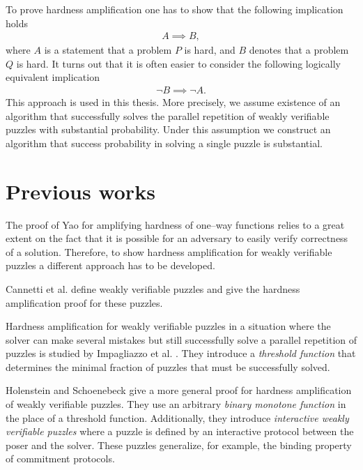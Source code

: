 To prove hardness amplification one has to show that the following implication holds
\begin{align*}
  A \implies B,
\end{align*}
where $A$ is a statement that a problem $P$ is hard, and $B$ denotes that a problem $Q$ is hard.
It turns out that it is often easier to consider the following logically equivalent implication
\begin{align*}
  \lnot B \implies \lnot A.
\end{align*}
This approach is used in this thesis. More precisely, we assume existence of an algorithm that successfully
solves the parallel repetition of weakly verifiable puzzles with substantial probability.
Under this assumption we construct an algorithm that success probability in solving a single puzzle is substantial.

\section{Previous works}
The proof of Yao for amplifying hardness of one--way functions relies to a great extent on the fact that it is possible
for an adversary to easily verify correctness of a solution. Therefore, to show hardness amplification
for weakly verifiable puzzles a different approach has to be developed.

Cannetti et al. \cite{canetti2005hardness} define weakly verifiable puzzles and give the hardness amplification proof for these puzzles.

Hardness amplification for weakly verifiable puzzles in a situation where the solver can make several mistakes but still
successfully solve a parallel repetition of puzzles is studied by Impagliazzo et al. \cite{impagliazzo2007chernoff}.
They introduce a \textit{threshold function} that determines the minimal fraction of puzzles that must be successfully solved.

Holenstein and Schoenebeck \cite{holenstein2011general} give a more general proof for hardness amplification
of weakly verifiable puzzles. They use an arbitrary \textit{binary monotone function} in the place of a threshold function.
Additionally, they introduce \textit{interactive weakly verifiable puzzles} where a puzzle is defined by
an interactive protocol between the poser and the solver. These puzzles generalize, for example, the binding property of commitment protocols.

